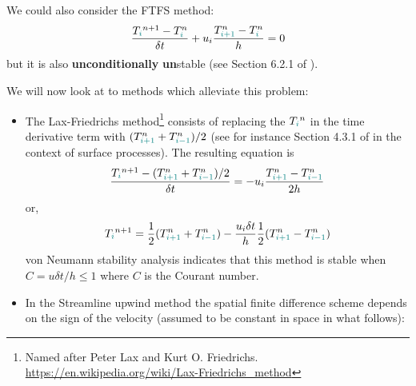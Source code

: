 We could also consider the FTFS method:
\[
\frac{T_{\color{teal}i}^{n+1}-T^n_{\color{teal}i}}{\delta t} 
+ u_i \frac{T^n_{\color{teal}i+1} - T^n_{{\color{teal}i}}}{h} =0 
\]
but it is also {\bf unconditionally} {\bf un}stable (see Section 6.2.1 of \cite{hoch}).

We will now look at to methods which alleviate this problem:


\begin{itemize}
\item The {\color{olive} Lax-Friedrichs method}\footnote{Named after Peter Lax 
and Kurt O. Friedrichs. \url{https://en.wikipedia.org/wiki/Lax-Friedrichs_method}} consists of replacing the $T_{\color{teal}i}^n$ 
in the time derivative term with $(T_{{\color{teal}i+1}}^n + T_{{\color{teal}i-1}}^n)/2$
(see for instance Section 4.3.1 of \cite{pell08} in the context of surface processes). 
The resulting equation is
\[
\frac{T_{\color{teal}i}^{n+1}-  (T_{{\color{teal}i+1}}^n + T_{{\color{teal}i-1}}^n)/2 }{\delta t} 
= - u_i \frac{T^n_{{\color{teal}i+1}}-T^n_{{\color{teal}i-1}}}{2 h}
\]
or, 
\[
T_{\color{teal}i}^{n+1} = \frac{1}{2} (T_{{\color{teal}i+1}}^n + T_{{\color{teal}i-1}}^n)  
- \frac{u_i \delta t}{h}  \frac{1}{2} (T^n_{{\color{teal}i+1}}-T^n_{{\color{teal}i-1}})
\]
von Neumann stability analysis indicates that this method is stable
when $C=u \delta t/h \leq 1$ where $C$ is the Courant number.

\item In the {\color{olive}Streamline upwind} method the spatial finite difference scheme 
depends on the sign of the velocity (assumed to be constant in space in what follows):



\end{itemize}
